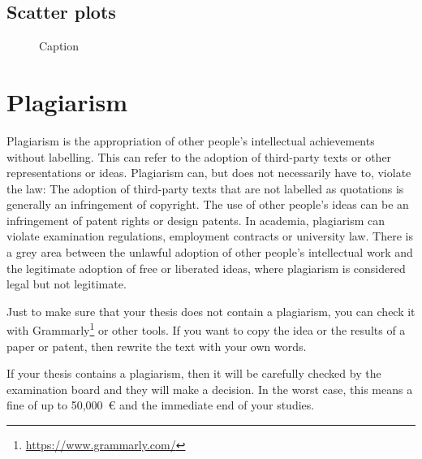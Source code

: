 \subsection{Scatter plots}
\begin{figure}[h]   \centering
{}
\caption{Caption}
\label{fig:task_knn}
\end{figure}
\newpage
\section{Plagiarism}
Plagiarism is the appropriation of other people's intellectual achievements without labelling. This can refer to the adoption of third-party texts or other representations or ideas. Plagiarism can, but does not necessarily have to, violate the law: The adoption of third-party texts that are not labelled as quotations is generally an infringement of copyright. The use of other people's ideas can be an infringement of patent rights or design patents. In academia, plagiarism can violate examination regulations, employment contracts or university law. There is a grey area between the unlawful adoption of other people's intellectual work and the legitimate adoption of free or liberated ideas, where plagiarism is considered legal but not legitimate.

Just to make sure that your thesis does not contain a plagiarism, you can check it with Grammarly\footnote{\url{https://www.grammarly.com/}} or other tools. If you want to copy the idea or the results of a paper or patent, then rewrite the text with your own words.

If your thesis contains a plagiarism, then it will be carefully checked by the examination board and they will make a decision. In the worst case, this means a fine of up to 50,000~€ and the immediate end of your studies.